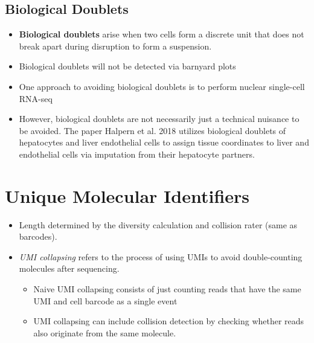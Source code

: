 \documentclass[10pt]{article}
\begin{document}
\subsection*{Biological Doublets}
\begin{itemize}
    \item \textbf{Biological doublets} arise when two cells form a discrete unit that does not break apart during disruption to form a suspension.
    \item Biological doublets will not be detected via barnyard plots
    \item One approach to avoiding biological doublets is to perform nuclear single-cell RNA-seq
    \item However, biological doublets are not necessarily just a technical nuisance to be avoided.  The paper Halpern et al. 2018 utilizes biological doublets of hepatocytes and liver endothelial cells to assign tissue coordinates to liver and endothelial cells via imputation from their hepatocyte partners.
\end{itemize}

\section*{Unique Molecular Identifiers}
\begin{itemize}
    \item Length determined by the diversity calculation and collision rater (same as barcodes).
    \item \textit{UMI collapsing} refers to the process of using UMIs to avoid double-counting molecules after sequencing.
    \begin{itemize}
        \item Naive UMI collapsing consists of just counting reads that have the same UMI and cell barcode as a single event
        \item UMI collapsing can include collision detection by checking whether reads also originate from the same molecule.
    \end{itemize}
\end{itemize}
\end{document}
